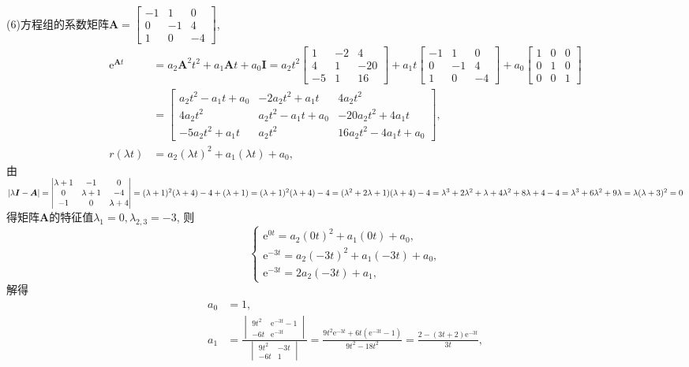 \documentclass[12pt,UTF8]{ctexart}
\newcommand{\me}[0]{\mathrm e}
\begin{document}
\begin{enumerate}
(6)方程组的系数矩阵$\bm A=\begin{bmatrix}-1&1&0\\0&-1&4\\1&0&-4\end{bmatrix}$, 
\[\begin{aligned}
\me^{\bm At}&=a_2\bm A^2t^2+a_1\bm At+a_0\bm I=a_2t^2\begin{bmatrix}1&-2&4\\4&1&-20\\-5&1&16\end{bmatrix}+a_1t\begin{bmatrix}-1&1&0\\0&-1&4\\1&0&-4\end{bmatrix}+a_0\begin{bmatrix}1&0&0\\0&1&0\\0&0&1\end{bmatrix}\\
&=\begin{bmatrix}a_2t^2-a_1t+a_0&-2a_2t^2+a_1t&4a_2t^2\\4a_2t^2&a_2t^2-a_1t+a_0&-20a_2t^2+4a_1t\\-5a_2t^2+a_1t&a_2t^2&16a_2t^2-4a_1t+a_0\end{bmatrix},\\
r(\lambda t)&=a_2(\lambda t)^2+a_1(\lambda t)+a_0,
\end{aligned}\]
由$|\lambda\bm I-\bm A|=\begin{vmatrix}\lambda+1&-1&0\\0&\lambda+1&-4\\-1&0&\lambda+4\end{vmatrix}=(\lambda+1)^2(\lambda+4)-4+(\lambda+1)=(\lambda+1)^2(\lambda+4)-4\\
=(\lambda^2+2\lambda+1)(\lambda+4)-4=\lambda^3+2\lambda^2+\lambda+4\lambda^2+8\lambda+4-4=\lambda^3+6\lambda^2+9\lambda=\lambda(\lambda+3)^2=0$得矩阵$\bm A$的特征值$\lambda_1=0,\lambda_{2,3}=-3$, 则
\[\begin{cases}
\me^{0t}=a_2(0t)^2+a_1(0t)+a_0,\\
\me^{-3t}=a_2(-3t)^2+a_1(-3t)+a_0,\\
\me^{-3t}=2a_2(-3t)+a_1,
\end{cases}\]
解得
\[\begin{aligned}
a_0&=1,\\
a_1&=\frac{\begin{vmatrix}9t^2&\me^{-3t}-1\\-6t&\me^{-3t}\end{vmatrix}}{\begin{vmatrix}9t^2&-3t\\-6t&1\end{vmatrix}}=\frac{9t^2\me^{-3t}+6t(\me^{-3t}-1)}{9t^2-18t^2}=\frac{2-(3t+2)\me^{-3t}}{3t},\\

\end{aligned}\]
\end{enumerate}
\end{document}
